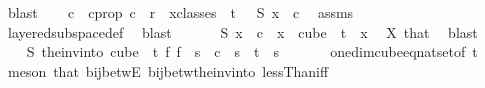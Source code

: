 \begin{isabellebody}
\ blast\isanewline
\isanewline
\ \ \isamarkupfalse%
\ c{}\ \ c{}{\isacharunderscore}{\kern0pt}prop{\isacharcolon}{\kern0pt}\ {\isachardoublequoteopen}c{}\ {\isacharless}{\kern0pt}\ r\ {\isasymand}\ {\isacharparenleft}{\kern0pt}{\isasymforall}x{\isasymin}classes\ {}\ t\ {}{\isachardot}{\kern0pt}\ {\isasymchi}\ {\isacharparenleft}{\kern0pt}S\ x{\isacharparenright}{\kern0pt}\ {\isacharequal}{\kern0pt}\ c{}{\isacharparenright}{\kern0pt}{\isachardoublequoteclose}\ \isamarkupfalse%
\ assms{\isacharparenleft}{\kern0pt}{}{\isacharparenright}{\kern0pt}\ \isanewline
\ \ \ \ \isamarkupfalse%
\ layered{\isacharunderscore}{\kern0pt}subspace{\isacharunderscore}{\kern0pt}def\ \isamarkupfalse%
\ blast\isanewline
\ \ \isamarkupfalse%
\ \isamarkupfalse%
\ {\isachardoublequoteopen}{\isacharparenleft}{\kern0pt}{\isasymchi}\ {\isacharparenleft}{\kern0pt}S\ x{\isacharparenright}{\kern0pt}\ {\isacharequal}{\kern0pt}\ c{}{\isacharparenright}{\kern0pt}{\isachardoublequoteclose}\ \ {\isachardoublequoteopen}x\ {\isasymin}\ cube\ {}\ t{\isachardoublequoteclose}\ \ x\ \isamarkupfalse%
\ X\ that\ \isamarkupfalse%
\ blast\isanewline
\ \ \isamarkupfalse%
\ \isamarkupfalse%
\ {\isachardoublequoteopen}{\isasymchi}\ {\isacharparenleft}{\kern0pt}S\ {\isacharparenleft}{\kern0pt}the{\isacharunderscore}{\kern0pt}inv{\isacharunderscore}{\kern0pt}into\ {\isacharparenleft}{\kern0pt}cube\ {}\ t{\isacharparenright}{\kern0pt}\ {\isacharparenleft}{\kern0pt}{\isasymlambda}f{\isachardot}{\kern0pt}\ f\ {}{\isacharparenright}{\kern0pt}\ s{\isacharparenright}{\kern0pt}{\isacharparenright}{\kern0pt}\ {\isacharequal}{\kern0pt}\ c{}{\isachardoublequoteclose}\ \ {\isachardoublequoteopen}s\ {\isacharless}{\kern0pt}\ t{\isachardoublequoteclose}\ \ s\ \isanewline
\ \ \ \ \isamarkupfalse%
\ one{\isacharunderscore}{\kern0pt}dim{\isacharunderscore}{\kern0pt}cube{\isacharunderscore}{\kern0pt}eq{\isacharunderscore}{\kern0pt}nat{\isacharunderscore}{\kern0pt}set{\isacharbrackleft}{\kern0pt}of\ t{\isacharbrackright}{\kern0pt}\ \isamarkupfalse%
\ {\isacharparenleft}{\kern0pt}meson\ that\ bij{\isacharunderscore}{\kern0pt}betwE\ bij{\isacharunderscore}{\kern0pt}betw{\isacharunderscore}{\kern0pt}the{\isacharunderscore}{\kern0pt}inv{\isacharunderscore}{\kern0pt}into\ lessThan{\isacharunderscore}{\kern0pt}iff{\isacharparenright}{\kern0pt}\isanewline

\end{isabellebody}
